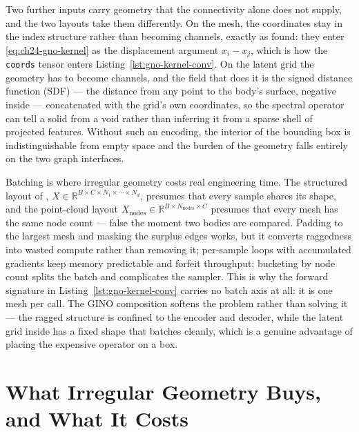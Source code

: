 Two further inputs carry geometry that the connectivity alone does not supply, and the two
layouts take them differently. On the mesh, the coordinates stay in the index structure rather
than becoming channels, exactly as 
found: they enter \eqref{eq:ch24-gno-kernel} as the displacement argument $x_i - x_j$, which is
how the \texttt{coords} tensor enters Listing~\ref{lst:gno-kernel-conv}. On the latent grid the
geometry has to become channels, and the field that does it is the signed distance function
(SDF) --- the distance from any point to the body's surface, negative inside
--- concatenated with the grid's own coordinates, so the
spectral operator can tell a solid from a void rather than inferring it from a sparse shell of
projected features. Without such an encoding, the interior of the bounding box is
indistinguishable from empty space and the burden of the geometry falls entirely on the two
graph interfaces.

Batching is where irregular geometry costs real engineering time. The structured layout of
, $X \in
\mathbb{R}^{B \times C \times N_1 \times \cdots \times N_d}$, presumes that every sample
shares its shape, and the point-cloud layout $X_{\text{nodes}} \in
\mathbb{R}^{B \times N_{\text{nodes}} \times C}$ presumes that every mesh has the same node
count --- false the moment two bodies are compared.
Padding to the
largest mesh and masking the surplus edges works, but it converts raggedness into wasted
compute rather than removing it; per-sample loops with accumulated gradients keep memory
predictable and forfeit throughput; bucketing by node count splits the batch and complicates
the sampler. This is why the forward signature in Listing~\ref{lst:gno-kernel-conv} carries no
batch axis at all: it is one mesh per call. The GINO composition softens the problem rather
than solving it --- the ragged structure is confined to the encoder and decoder, while the
latent grid inside has a fixed shape that batches cleanly, which is a genuine advantage of
placing the expensive operator on a box.

\section{What Irregular Geometry Buys, and What It Costs}
\label{sec:ch24-ledger}

